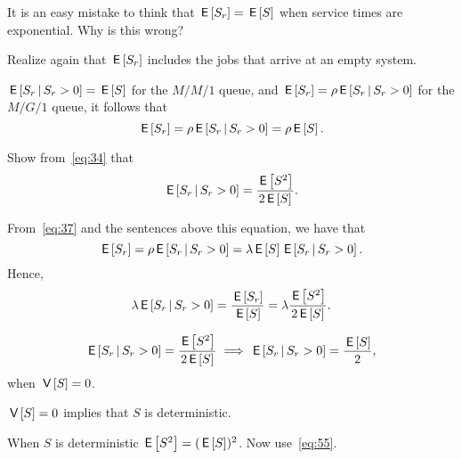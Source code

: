 \begin{extra}
 It is an easy mistake to think that $\E{S_r} = \E S$ when service
 times are exponential. Why is this wrong?
\begin{hint}
Realize again that $\E{S_r}$ includes the jobs that arrive at an empty system.
\end{hint}
\begin{solution}

 $\E{S_r \given S_r>0} = \E S$ for the $M/M/1$ queue, and
 $\E{S_r} = \rho \E{S_r \given S_r>0}$ for the $M/G/1$ queue, it
 follows that
 \begin{equation*}
 \E{S_r} = \rho \E{S_r\given S_r>0} = \rho \E S.
 \end{equation*}
\end{solution}
\end{extra}




\begin{exercise} 
Show from~\cref{eq:34} that 
\begin{equation}\label{eq:55}
\E{S_r\given S_r>0} = \frac{\E{S^2}}{2 \E S}.
\end{equation}
\begin{solution}
 From~\cref{eq:37} and the sentences above this equation,
 we have that
 \begin{equation*}
 \E{S_r} = \rho \E{S_r\given S_r>0}=\lambda \E S \E{S_r\given S_r>0}.
 \end{equation*}
Hence,
 \begin{equation*}
 \lambda \E{S_r\given S_r>0} = \frac{\E{S_r}}{\E S} = \lambda \frac{\E{S^2}}{2 \E S}.
 \end{equation*}
\end{solution}
\end{exercise}


\begin{extra}
\begin{equation*}
\E{S_r\given S_r>0} = \frac{\E{S^2}}{2 \E S} \implies \E {S_r\given S_r>0} = \frac{\E S} 2,
\end{equation*}
when $\V{S} = 0$. 
\begin{hint}
 $\V S = 0$ implies that $S$ is deterministic.
\end{hint}
\begin{solution}
 When $S$ is deterministic $\E{S^2} = (\E{S})^2$. Now use~\cref{eq:55}.
\end{solution}
\end{extra}

